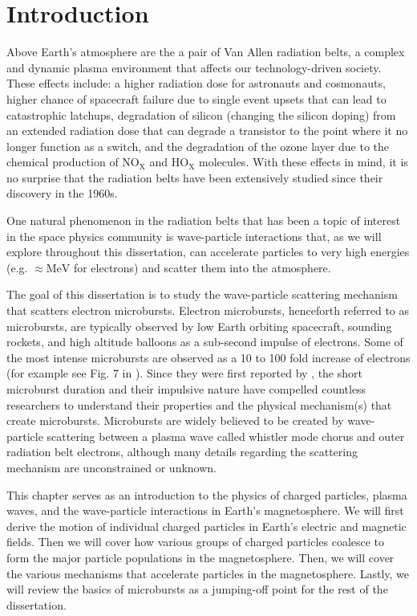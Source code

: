 \chapter{Introduction}\label{CH:introduction}
Above Earth's atmosphere are the a pair of Van Allen radiation belts, a complex and dynamic plasma environment that affects our technology-driven society. These effects include: a higher radiation dose for astronauts and cosmonauts, higher chance of spacecraft failure due to single event upsets that can lead to catastrophic latchups, degradation of silicon (changing the silicon doping) from an extended radiation dose that can degrade a transistor to the point where it no longer function as a switch, and the degradation of the ozone layer due to the chemical production of $\mathrm{NO_X}$ and $\mathrm{HO_X}$ molecules. With these effects in mind, it is no surprise that the radiation belts have been extensively studied since their discovery in the 1960s.

One natural phenomenon in the radiation belts that has been a topic of interest in the space physics community is wave-particle interactions that, as we will explore throughout this dissertation, can accelerate particles to very high energies (e.g. $\approx \mathrm{MeV}$ for electrons) and scatter them into the atmosphere.

The goal of this dissertation is to study the wave-particle scattering mechanism that scatters electron microbursts. Electron microbursts, henceforth referred to as microbursts, are typically observed by low Earth orbiting spacecraft, sounding rockets, and high altitude balloons as a sub-second impulse of electrons. Some of the most intense microbursts are observed as a 10 to 100 fold increase of electrons (for example see Fig. 7 in \citet{Blake1996}). Since they were first reported by \citet{Anderson1964}, the short microburst duration and their impulsive nature have compelled countless researchers to understand their properties and the physical mechanism(s) that create microbursts. Microbursts are widely believed to be created by wave-particle scattering between a plasma wave called whistler mode chorus and outer radiation belt electrons, although many details regarding the scattering mechanism are unconstrained or unknown.

This chapter serves as an introduction to the physics of charged particles, plasma waves, and the wave-particle interactions in Earth's magnetosphere. We will first derive the motion of individual charged particles in Earth's electric and magnetic fields. Then we will cover how various groups of charged particles coalesce to form the major particle populations in the magnetosphere. Then, we will cover the various mechanisms that accelerate particles in the magnetosphere. Lastly, we will review the basics of microbursts as a jumping-off point for the rest of the dissertation. 

